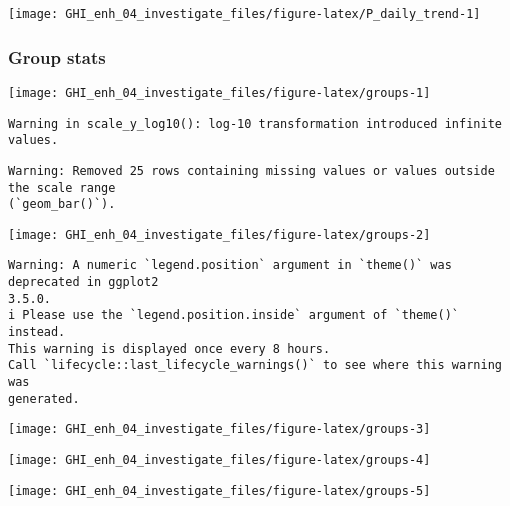 \documentclass[
  10pt,
  a4paper,oneside]{article}
\begin{document}
\begin{center}\texttt{[image: GHI\_enh\_04\_investigate\_files/figure-latex/P\_daily\_trend-1]} \end{center}

\newpage
\FloatBarrier

\hypertarget{group-stats}{%
\subsubsection{Group stats}\label{group-stats}}

\begin{center}\texttt{[image: GHI\_enh\_04\_investigate\_files/figure-latex/groups-1]} \end{center}

\begin{verbatim}
Warning in scale_y_log10(): log-10 transformation introduced infinite values.
\end{verbatim}

\begin{verbatim}
Warning: Removed 25 rows containing missing values or values outside the scale range
(`geom_bar()`).
\end{verbatim}

\begin{center}\texttt{[image: GHI\_enh\_04\_investigate\_files/figure-latex/groups-2]} \end{center}

\begin{verbatim}
Warning: A numeric `legend.position` argument in `theme()` was deprecated in ggplot2
3.5.0.
i Please use the `legend.position.inside` argument of `theme()` instead.
This warning is displayed once every 8 hours.
Call `lifecycle::last_lifecycle_warnings()` to see where this warning was
generated.
\end{verbatim}

\begin{center}\texttt{[image: GHI\_enh\_04\_investigate\_files/figure-latex/groups-3]} \end{center}

\begin{center}\texttt{[image: GHI\_enh\_04\_investigate\_files/figure-latex/groups-4]} \end{center}

\begin{center}\texttt{[image: GHI\_enh\_04\_investigate\_files/figure-latex/groups-5]} \end{center}
\end{document}
